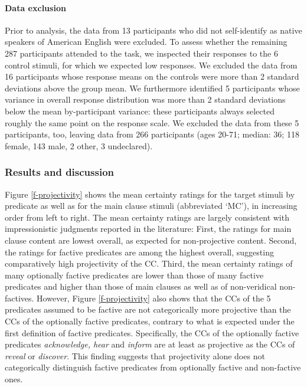 \documentclass[11pt,fleqn]{article}
\newcommand{\6}{\mbox{$[\hspace*{-.6mm}[$}}
\newcommand{\9}{\mbox{$]\hspace*{-.6mm}]$}}
\begin{document}
\paragraph{Data exclusion}
Prior to analysis, the data from 13 participants who did not self-identify as native speakers of American English were excluded. To assess whether the remaining 287 participants attended to the task, we inspected their responses to the 6 control stimuli, for which we expected low responses. We excluded the data from 16 participants whose response means on the controls were more than 2 standard deviations above the group mean. We furthermore identified 5 participants whose variance in overall response distribution was more than 2 standard deviations below the mean by-participant variance: these participants always selected roughly the same point on the response scale. We excluded the data from these 5 participants, too, leaving data from 266 participants (ages 20-71; median: 36; 118 female, 143 male, 2 other, 3 undeclared).

\subsubsection{Results and discussion}\label{s22}

Figure \ref{f-projectivity} shows the mean certainty ratings for the target stimuli by predicate as well as for the main clause stimuli (abbreviated `MC'), in increasing order from left to right. The mean certainty ratings are largely consistent with impressionistic judgments reported in the literature: First, the ratings for main clause content are lowest overall, as expected for non-projective content. Second, the ratings for factive predicates are among the highest overall, suggesting comparatively high projectivity of the CC. Third, the mean certainty ratings of many optionally factive predicates are lower than those of many factive predicates and higher than those of main clauses as well as of non-veridical non-factives. However, Figure \ref{f-projectivity} also shows that the CCs of the 5 predicates assumed to be factive are not categorically more projective than the CCs of the optionally factive predicates, contrary to what is expected under the first definition of factive predicates. Specifically, the CCs of the optionally factive predicates {\em acknowledge, hear} and {\em inform} are at least as projective as the CCs of {\em reveal} or {\em discover}. This finding suggests that projectivity alone does not categorically distinguish factive predicates from optionally factive and non-factive ones.
\end{document}
